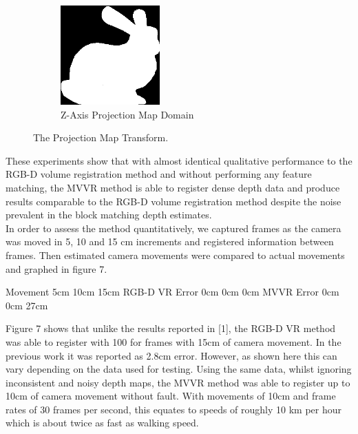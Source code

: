 \begin{figure}[!htb]
\begin{subfigure}[b]{1.5in}
                \label{fig:yaxPMDOM}
        \end{subfigure}%
        \begin{subfigure}[b]{1.5in}
                \includegraphics[width=1.5in]{images/methodology/FVR/zaxis}
                \caption{Z-Axis Projection Map Domain}
                \label{fig:zaxPMDOM}
        \end{subfigure}
        \caption{The Projection Map Transform.}
       \label{fig:pmtExample}
\end{figure}

These experiments show that with almost identical
qualitative performance to the RGB-D volume registration
method and without performing any feature matching, the
MVVR method is able to register dense depth data and
produce results comparable to the RGB-D volume
registration method despite the noise prevalent in the block
matching depth estimates. \\
In order to assess the method quantitatively, we captured
frames as the camera was moved in 5, 10 and 15 cm
increments and registered information between frames. Then
estimated camera movements were compared to actual
movements and graphed in figure 7.

Movement
5cm
10cm
15cm
RGB-D VR Error
0cm
0cm
0cm
MVVR Error
0cm
0cm
27cm


Figure 7 shows that unlike the results reported in [1], the
RGB-D VR method was able to register with 100%
for frames with 15cm of camera movement. In the previous
work it was reported as 2.8cm error. However, as shown here
this can vary depending on the data used for testing. Using
the same data, whilst ignoring inconsistent and noisy depth
maps, the MVVR method was able to register up to 10cm of
camera movement without fault. With movements of 10cm
and frame rates of 30 frames per second, this equates to
speeds of roughly 10 km per hour which is about twice as
fast as walking speed.
